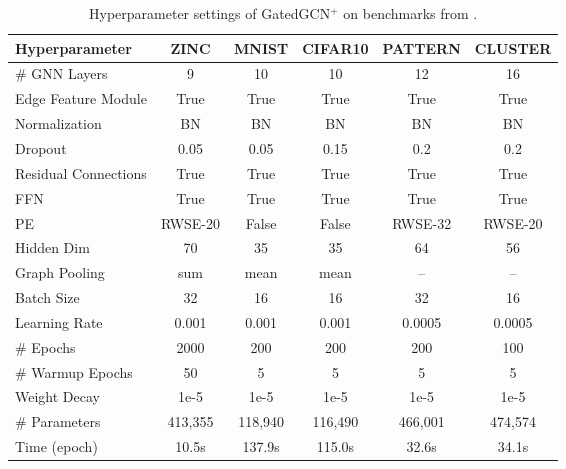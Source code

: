 \clearpage

\begin{table*}[h]
	\centering
        \small
         \caption{Hyperparameter settings of GatedGCN$^+$ on benchmarks from \cite{dwivedi2023benchmarking}.}
	\begin{tabular}{lccccc}
		\toprule
		{Hyperparameter} & {ZINC} & {MNIST} & {CIFAR10} & {PATTERN} & {CLUSTER}\\
		\midrule
            \# GNN Layers & 9 & 10 & 10 & 12 & 16 \\
            Edge Feature Module & True & True & True & True & True \\
            Normalization & BN & BN & BN & BN & BN \\
            Dropout & 0.05 & 0.05 & 0.15 & 0.2 & 0.2 \\
            Residual Connections & True & True & True & True & True \\
            FFN & True & True & True & True & True \\
            PE & RWSE-20 & False & False & RWSE-32 & RWSE-20 \\
            Hidden Dim & 70 & 35 & 35 & 64 & 56 \\
            Graph Pooling & sum & mean & mean & – & – \\
		\midrule
            Batch Size & 32 & 16 & 16 & 32 & 16 \\
            Learning Rate & 0.001 & 0.001 & 0.001 & 0.0005 & 0.0005 \\
            \# Epochs & 2000 & 200 & 200 & 200  & 100 \\
            \# Warmup Epochs & 50 & 5 & 5 & 5 & 5 \\
            Weight Decay & 1e-5 & 1e-5 & 1e-5 & 1e-5 & 1e-5 \\
		\midrule
            \# Parameters & 413,355 & 118,940 & 116,490 & 466,001 & 474,574 \\
            Time (epoch) & 10.5s & 137.9s & 115.0s & 32.6s & 34.1s \\
        \bottomrule
	\end{tabular}



	\label{tab:gatedgcn-parameter1}
\end{table*}

